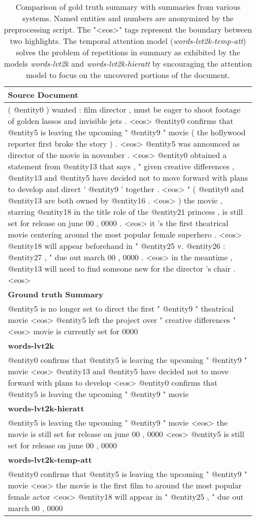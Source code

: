 \documentclass[11pt]{article}
\begin{document}
\begin{table*}[htpb]
\centering
\begin{tabular}{|p{15cm}|}
\hline
{\bf Source Document}\\
\hline
( @entity0 ) wanted : film director , must be eager to shoot footage of golden lassos and invisible jets . <eos> @entity0 confirms that @entity5 is leaving the upcoming " @entity9 " movie ( the hollywood reporter first broke the story ) . <eos> @entity5 was announced as director of the movie in november . <eos> @entity0 obtained a statement from @entity13 that says , " given creative differences , @entity13 and @entity5 have decided not to move forward with plans to develop and direct ' @entity9 ' together . <eos> " ( @entity0 and @entity13 are both owned by @entity16 . <eos> ) the movie , starring @entity18 in the title role of the @entity21 princess , is still set for release on june 00 , 0000 . <eos> it 's the first theatrical movie centering around the most popular female superhero . <eos> @entity18 will appear beforehand in " @entity25 v. @entity26 : @entity27 , " due out march 00 , 0000 . <eos> in the meantime , @entity13 will need to find someone new for the director 's chair . <eos> \\
\hline
{\bf Ground truth Summary}\\
\hline
@entity5 is no longer set to direct the first " @entity9 " theatrical movie <eos> @entity5 left the project over " creative differences " <eos> movie is currently set for 0000 \\
\hline
{\bf words-lvt2k}\\
\hline
@entity0 confirms that @entity5 is leaving the upcoming " @entity9 " movie <eos> @entity13 and @entity5 have decided not to move forward with plans to develop <eos> @entity0 confirms that @entity5 is leaving the upcoming " @entity9 " movie \\
\hline
{\bf words-lvt2k-hieratt}\\
\hline
@entity5 is leaving the upcoming " @entity9 " movie <eos> the movie is still set for release on june 00 , 0000 <eos> @entity5 is still set for release on june 00 , 0000 \\
\hline
{\bf words-lvt2k-temp-att}\\
\hline
@entity0 confirms that @entity5 is leaving the upcoming " @entity9 " movie <eos> the movie is the first film to around the most popular female actor <eos> @entity18 will appear in " @entity25 , " due out march 00 , 0000 \\
\hline
\end{tabular}
\caption{Comparison of gold truth summary with summaries from various systems. Named entities and numbers are anonymized by the preprocessing script. The "<eos>" tags represent the boundary between two highlights. The temporal attention model ({\it words-lvt2k-temp-att}) solves the problem of repetitions in summary as exhibited by the models {\it words-lvt2k} and {\it words-lvt2k-hieratt} by encouraging the attention model to focus on the uncovered portions of the document.}
\label{tab:cnn_example}
\end{table*}
\end{document}
